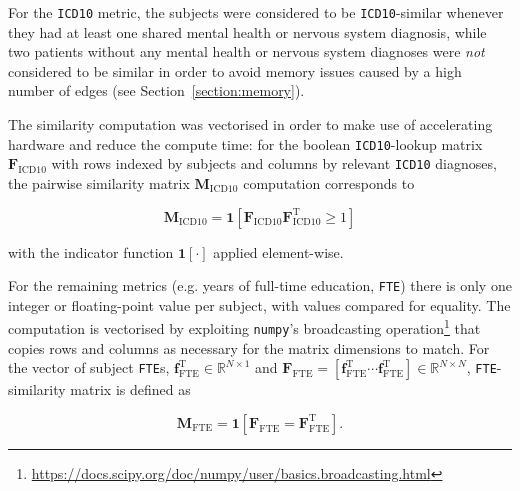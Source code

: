 For the \texttt{ICD10} metric, the subjects were considered to be \texttt{ICD10}-similar whenever they had at least one shared mental health or nervous system diagnosis, while two patients without any mental health or nervous system diagnoses were \textit{not} considered to be similar in order to avoid memory issues caused by a high number of edges (see Section~\ref{section:memory}). 

The similarity computation was vectorised in order to make use of accelerating hardware and reduce the compute time: for the boolean \texttt{ICD10}-lookup matrix $\mathbf{F}_{\text{ICD10}}$ with rows indexed by subjects and columns by relevant \texttt{ICD10} diagnoses, the pairwise similarity matrix $\mathbf{M}_{\text{ICD10}}$ computation corresponds to 

\begin{equation}
    \mathbf{M}_{\text{ICD10}} = \mathbf{1}\left[\mathbf{F}_{\text{ICD10}}^{\ }\mathbf{F}_{\text{ICD10}}^{\mathrm{T}} \geq 1\right]
\end{equation}

with the indicator function $\mathbf{1}[\cdot]$ applied element-wise.

For the remaining metrics (e.g. years of full-time education, \texttt{FTE}) there is only one integer or floating-point value per subject, with values  compared for equality. The computation is vectorised by exploiting \texttt{numpy}'s broadcasting operation\footnote{\url{https://docs.scipy.org/doc/numpy/user/basics.broadcasting.html}} that copies rows and columns as necessary for the matrix dimensions to match. For the vector of subject \texttt{FTE}s, $\mathbf{f}_{\text{FTE}}^{\mathrm{T}} \in \mathbb{R}^{N \times 1}$ and $\mathbf{F}_{\text{FTE}} = [\mathbf{f}_{\text{FTE}}^{\mathrm{T}} \cdots \mathbf{f}_{\text{FTE}}^{\mathrm{T}}] \in \mathbb{R}^{N \times N}$, \texttt{FTE}-similarity matrix is defined as

\begin{equation}
    \mathbf{M}_{\text{FTE}} = \mathbf{1}\left[\mathbf{F}_{\text{FTE}}^{\ } = \mathbf{F}_{\text{FTE}}^{\mathrm{T}} \right].
\end{equation}



